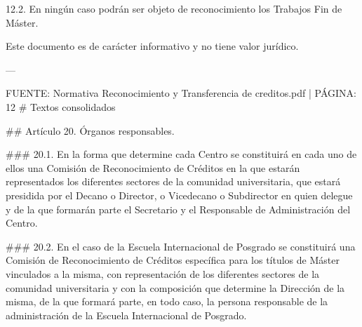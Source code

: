 \documentclass{article}
\begin{document}
\begin{itemize}
\begin{itemize}
\begin{scriptsize}
                  12.2. En ningún caso podrán ser objeto de reconocimiento los Trabajos Fin de Máster.

                  Este documento es de carácter informativo y no tiene valor jurídico.

                  ---

                  FUENTE: Normativa Reconocimiento y Transferencia de creditos.pdf | PÁGINA: 12
                  \# Textos consolidados

                  \#\# Artículo 20. Órganos responsables.

                  \#\#\# 20.1.
                  En la forma que determine cada Centro se constituirá en cada uno de ellos una Comisión de Reconocimiento de Créditos en la que estarán representados los diferentes sectores de la comunidad universitaria, que estará presidida por el Decano o Director, o Vicedecano o Subdirector en quien delegue y de la que formarán parte el Secretario y el Responsable de Administración del Centro.

                  \#\#\# 20.2.
                  En el caso de la Escuela Internacional de Posgrado se constituirá una Comisión de Reconocimiento de Créditos específica para los títulos de Máster vinculados a la misma, con representación de los diferentes sectores de la comunidad universitaria y con la composición que determine la Dirección de la misma, de la que formará parte, en todo caso, la persona responsable de la administración de la Escuela Internacional de Posgrado.


\end{scriptsize}
\end{itemize}
\end{itemize}
\end{document}
